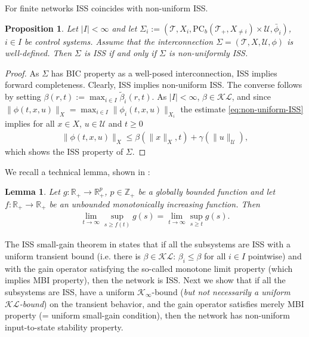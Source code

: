 \documentclass[twocolumn]{IEEEtran} %
\newtheorem{lemma}[theorem]{Lemma}
\newtheorem{proposition}[theorem]{Proposition}
\theoremstyle{definition}
\newcommand{\tm}{\times}%
\newcommand{\Uc}{\mathcal{U}}%
\newcommand{\R}{\mathbb{R}}%
\newcommand{\Kinf}{\mathcal{K_\infty}}%
\newcommand{\KL}{\mathcal{KL}}%
\newcommand{\PC}{\mathrm{PC}}%
\newcommand{\Z}{\mathbb{Z}}%
\newcommand{\T}{\ensuremath{\mathcal{T}}}  %
\begin{document}
For finite networks ISS coincides with non-uniform ISS.
\begin{proposition}
\label{prop:ISS-of-finite-networks} 
Let $|I|<\infty$ and let $\Sigma_i:=(\T, X_i,\PC_b(\T_+,X_{\neq i}) \tm \Uc,\bar{\phi}_i)$, $i\in I$ be control systems. Assume that the interconnection $\Sigma=(\T, X,\Uc,\phi)$ is well-defined.
Then $\Sigma$ is ISS if and only if $\Sigma$ is non-uniformly ISS.
\end{proposition}

\begin{proof}
As $\Sigma$ has BIC property as a well-posed interconnection, ISS implies forward completeness. 
Clearly, ISS implies non-uniform ISS. The converse follows by setting $\beta(r,t):=\max_{i\in I} \tilde{\beta}_i(r,t)$. As $|I|<\infty$, $\beta \in\KL$, and since $\|\phi(t,x,u)\|_{X}=\max_{i\in I}\|\phi_i(t,x,u)\|_{X_i}$ the estimate \eqref{eq:non-uniform-ISS} implies 
for all $x\in X$,  $u\in \Uc$ and  $t\geq0$
\begin{eqnarray*}
\|\phi(t,x,u)\|_{X} \leq \beta(\|x\|_X,t) + \gamma(\|u\|_{\Uc}),
\end{eqnarray*}
which shows the ISS property of $\Sigma$.
\end{proof}

We recall a technical lemma, shown in \cite{Mir19b}:
\begin{lemma}\label{lem:LimSupEstimate}
Let $g:\R_+\to\R^p_+$, $p\in\Z_+$ be a globally bounded function and let $f:\R_+\to\R_+$ be an unbounded monotonically increasing function. Then%
\begin{eqnarray}
\lim_{t\to\infty} \sup_{s\geq f(t)} g(s)  =  \lim_{t\to\infty} \sup_{s\geq t} g(s). 
\label{eq:LimSupEstimate}
\end{eqnarray}
\end{lemma}


The ISS small-gain theorem in \cite[Theorem 2]{MKG20} states that if all the subsystems are ISS with a uniform transient bound (i.e. there is $\beta\in\KL$: $\beta_i \leq \beta$ for all $i\in I$ pointwise) and with the gain operator satisfying the so-called monotone limit property (which implies MBI property), then the network is ISS.
Next we show that if all the subsystems are ISS, have a uniform $\Kinf$-bound (\emph{but not necessarily a uniform $\KL$-bound}) on the transient behavior, and the gain operator satisfies merely MBI property (= uniform small-gain condition), then the network has non-uniform input-to-state stability property.
\end{document}
